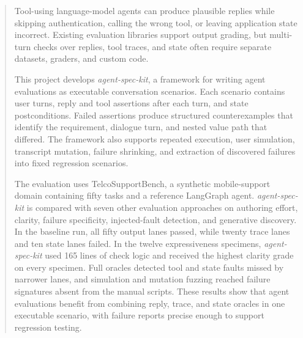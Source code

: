 \begin{abstract}
Tool-using language-model agents can produce plausible replies while skipping authentication, calling the wrong tool, or leaving application state incorrect. Existing evaluation libraries support output grading, but multi-turn checks over replies, tool traces, and state often require separate datasets, graders, and custom code.

This project develops \emph{agent-spec-kit}, a framework for writing agent evaluations as executable conversation scenarios. Each scenario contains user turns, reply and tool assertions after each turn, and state postconditions. Failed assertions produce structured counterexamples that identify the requirement, dialogue turn, and nested value path that differed. The framework also supports repeated execution, user simulation, transcript mutation, failure shrinking, and extraction of discovered failures into fixed regression scenarios.

The evaluation uses TelcoSupportBench, a synthetic mobile-support domain containing fifty tasks and a reference LangGraph agent. \emph{agent-spec-kit} is compared with seven other evaluation approaches on authoring effort, clarity, failure specificity, injected-fault detection, and generative discovery. In the baseline run, all fifty output lanes passed, while twenty trace lanes and ten state lanes failed. In the twelve expressiveness specimens, \emph{agent-spec-kit} used 165 lines of check logic and received the highest clarity grade on every specimen. Full oracles detected tool and state faults missed by narrower lanes, and simulation and mutation fuzzing reached failure signatures absent from the manual scripts. These results show that agent evaluations benefit from combining reply, trace, and state oracles in one executable scenario, with failure reports precise enough to support regression testing.
\end{abstract}
